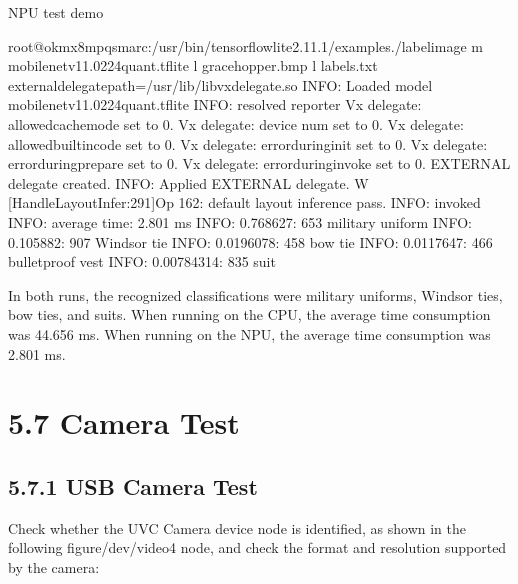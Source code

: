 \documentclass[letterpaper,10pt,openany,english]{sphinxmanual}
\begin{document}
\sphinxAtStartPar
NPU test demo

\begin{sphinxVerbatim}[commandchars=\\\{\}]
root@ok\PYGZhy{}mx8mpq\PYGZhy{}smarc:/usr/bin/tensorflow\PYGZhy{}lite\PYGZhy{}2.11.1/examples\PYGZsh{}./label\PYGZus{}image \PYGZhy{}m mobilenet\PYGZus{}v1\PYGZus{}1.0\PYGZus{}224\PYGZus{}quant.tflite  \PYGZhy{}l grace\PYGZus{}hopper.bmp  \PYGZhy{}l labels.txt 
\PYGZhy{}\PYGZhy{}external\PYGZus{}delegate\PYGZus{}path=/usr/lib/libvx\PYGZus{}delegate.so
INFO: Loaded model mobilenet\PYGZus{}v1\PYGZus{}1.0\PYGZus{}224\PYGZus{}quant.tflite
INFO: resolved reporter
Vx delegate: allowed\PYGZus{}cache\PYGZus{}mode set to 0.
Vx delegate: device num set to 0.
Vx delegate: allowed\PYGZus{}builtin\PYGZus{}code set to 0.
Vx delegate: error\PYGZus{}during\PYGZus{}init set to 0.
Vx delegate: error\PYGZus{}during\PYGZus{}prepare set to 0.
Vx delegate: error\PYGZus{}during\PYGZus{}invoke set to 0.
EXTERNAL delegate created.
INFO: Applied EXTERNAL delegate.
W [HandleLayoutInfer:291]Op 162: default layout inference pass.
INFO: invoked
INFO: average time: 2.801 ms
INFO: 0.768627: 653 military uniform
INFO: 0.105882: 907 Windsor tie
INFO: 0.0196078: 458 bow tie
INFO: 0.0117647: 466 bulletproof vest
INFO: 0.00784314: 835 suit
\end{sphinxVerbatim}

\sphinxAtStartPar
In both runs, the recognized classifications were military uniforms, Windsor ties, bow ties, and suits. When running on the CPU, the average time consumption was 44.656 ms. When running on the NPU, the average time consumption was 2.801 ms.


\section{5.7 Camera Test}
\label{\detokenize{linux-manual:id7}}
\sphinxAtStartPar
{}


\subsection{5.7.1 USB Camera Test}
\label{\detokenize{linux-manual:usb-camera-test}}
\sphinxAtStartPar
Check whether the UVC Camera device node is identified, as shown in the following figure/dev/video4 node, and check the format and resolution supported by the camera:
\end{document}

